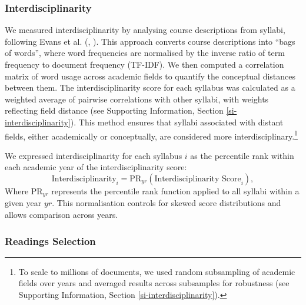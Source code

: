 \documentclass[
  12pt,
]{article}
\begin{document}
\subsubsection{Interdisciplinarity}\label{interdisciplinarity}

We measured interdisciplinarity by analysing course descriptions from syllabi, following Evans et al. (, ). This approach converts course descriptions into ``bags of words'', where word frequencies are normalised by the inverse ratio of term frequency to document frequency (TF-IDF). We then computed a correlation matrix of word usage across academic fields to quantify the conceptual distances between them. The interdisciplinarity score for each syllabus was calculated as a weighted average of pairwise correlations with other syllabi, with weights reflecting field distance (see Supporting Information, Section \ref{si-interdisciplinarity}). This method ensures that syllabi associated with distant fields, either academically or conceptually, are considered more interdisciplinary.\footnote{To scale to millions of documents, we used random subsampling of academic fields over years and averaged results across subsamples for robustness (see Supporting Information, Section \ref{si-interdisciplinarity}).}

We expressed interdisciplinarity for each syllabus \(i\) as the percentile rank within each academic year of the interdisciplinarity score:
\[
  \text{Interdisciplinarity}_i = \text{PR}_{yr} (\text{Interdisciplinarity Score}_i),
\]
Where \(\text{PR}_{yr}\) represents the percentile rank function applied to all syllabi within a given year \(yr\). This normalisation controls for skewed score distributions and allows comparison across years.

\subsubsection{Readings Selection}\label{readings-selection}
\end{document}
